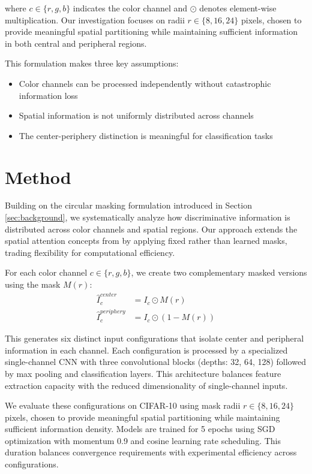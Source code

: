 \documentclass{article} %
\begin{document}
where $c \in \{r,g,b\}$ indicates the color channel and $\odot$ denotes element-wise multiplication. Our investigation focuses on radii $r \in \{8, 16, 24\}$ pixels, chosen to provide meaningful spatial partitioning while maintaining sufficient information in both central and peripheral regions.

This formulation makes three key assumptions:
\begin{itemize}
    \item Color channels can be processed independently without catastrophic information loss
    \item Spatial information is not uniformly distributed across channels
    \item The center-periphery distinction is meaningful for classification tasks
\end{itemize}

\section{Method}
\label{sec:method}

Building on the circular masking formulation introduced in Section \ref{sec:background}, we systematically analyze how discriminative information is distributed across color channels and spatial regions. Our approach extends the spatial attention concepts from \citet{Jaderberg2015SpatialTN} by applying fixed rather than learned masks, trading flexibility for computational efficiency.

For each color channel $c \in \{r,g,b\}$, we create two complementary masked versions using the mask $M(r)$:
\begin{align*}
\hat{I}_c^{center} &= I_c \odot M(r) \\
\hat{I}_c^{periphery} &= I_c \odot (1-M(r))
\end{align*}

This generates six distinct input configurations that isolate center and peripheral information in each channel. Each configuration is processed by a specialized single-channel CNN with three convolutional blocks (depths: 32, 64, 128) followed by max pooling and classification layers. This architecture balances feature extraction capacity with the reduced dimensionality of single-channel inputs.

We evaluate these configurations on CIFAR-10 using mask radii $r \in \{8, 16, 24\}$ pixels, chosen to provide meaningful spatial partitioning while maintaining sufficient information density. Models are trained for 5 epochs using SGD optimization with momentum 0.9 and cosine learning rate scheduling. This duration balances convergence requirements with experimental efficiency across configurations.
\end{document}
